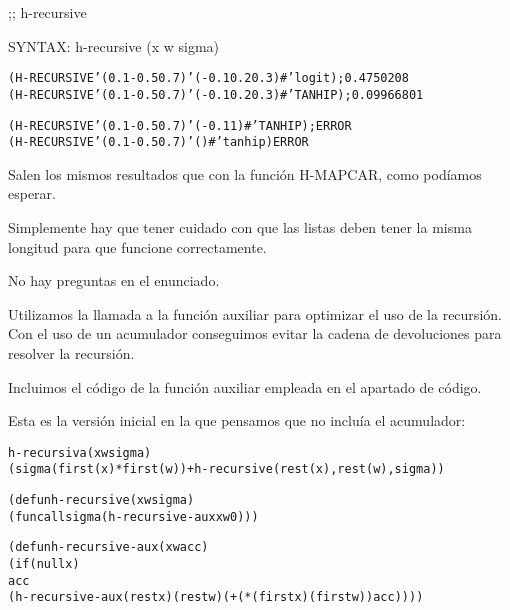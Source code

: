 \begin{aibox}{\function}
;; h-recursive

SYNTAX: h-recursive (x w sigma) 
\end{aibox}

\begin{aibox}{\examples}
\begin{alltt}
(H-RECURSIVE '(0.1 -0.5 0.7) '(-0.1 0.2 0.3) #'logit); 0.4750208
(H-RECURSIVE '(0.1 -0.5 0.7) '(-0.1 0.2 0.3) #'TANHIP); 0.09966801

(H-RECURSIVE '(0.1 -0.5 0.7) '(-0.1 1) #'TANHIP); ERROR
(H-RECURSIVE '(0.1 -0.5 0.7) '() #'tanhip) ERROR
\end{alltt}
\end{aibox}

\begin{aibox}{\comments}
Salen los mismos resultados que con la función H-MAPCAR, como podíamos esperar. 

Simplemente hay que tener cuidado con que las listas deben tener la misma longitud para que funcione correctamente.
\end{aibox}
\begin{aibox}{\answers}
No hay preguntas en el enunciado.
\end{aibox}
\begin{aibox}{\othercomments}
Utilizamos la llamada a la función auxiliar para optimizar el uso de la recursión. Con el uso de un acumulador conseguimos evitar la cadena de devoluciones para resolver la recursión.

Incluimos el código de la función auxiliar empleada en el apartado de código.
\end{aibox}

\begin{aibox}{\pseudocode}
Esta es la versión inicial en la que pensamos que no incluía el acumulador: 
\begin{alltt}
h-recursiva (x w sigma)
     (sigma(first(x)*first(w)) + h-recursive(rest(x),rest(w),sigma))
\end{alltt}
\end{aibox}
\begin{aibox}{\code}

\begin{alltt}

(defun h-recursive (x w sigma) 
        (funcall sigma (h-recursive-aux x w 0)))

(defun h-recursive-aux (x w acc)
    (if (null x)
          acc
    (h-recursive-aux (rest x) (rest w) ( + (* (first x)  (first w)) acc))))


\end{alltt}
\end{aibox}
